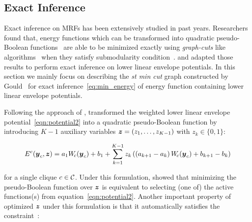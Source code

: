 \subsection{Exact Inference}
\label{sec:exact_inference}

Exact inference on MRFs has been extensively studied in past
years. Researchers found that, energy functions which can be
transformed into quadratic pseudo-Boolean
functions~\cite{Ishikawa:PAMI03,Ishikawa:CVPR09,Rother:CVPR09}
are able to be minimized exactly using \emph{graph-cuts} like
algorithms~\cite{Freedman:CVPR05,Hammer:1965} when they satisfy
submodularity condition~\cite{Boros:MATH02}.
 and  adapted those
results to perform exact inference on lower linear envelope
potentials. In this section we mainly focus on describing the
\emph{st min cut} graph constructed by
Gould~\cite{Gould:ICML2011,gouldlearning} for exact
inference~\eqref{eq:min_energy} of energy function containing
lower linear envelope potentials.

Following the approach of ,
 transformed the weighted
lower linear envelope potential~\eqref{eqn:potential2} into a
quadratic pseudo-Boolean function by introducing $K-1$ auxiliary
variables ${\boldsymbol{z}} = \left(z_1, \ldots, z_{K-1}\right)$ with $z_k\in
\{0,1\}$:

\begin{align}
  E^c({\boldsymbol{y}}_c, {\boldsymbol{z}}) = a_1 W_{\!c}({\boldsymbol{y}}_c) + b_1
  {}+ \sum_{k = 1}^{K-1} z_k \left( \left(a_{k+1} - a_k\right) W_{\!c}({\boldsymbol{y}}_c) + b_{k+1} - b_k \right)
  \label{eqn:binary_concave_z}
\end{align}

\noindent for a single clique $c \in {\cal C}$. Under this formulation,
 showed that minimizing
the pseudo-Boolean function over ${\boldsymbol{z}}$ is equivalent to selecting
(one of) the active functions(s) from
equation~\eqref{eqn:potential2}. Another important property of
optimized ${\boldsymbol{z}}$ under this formulation is that it
automatically satisfies the constraint~\cite{gouldlearning}: 

